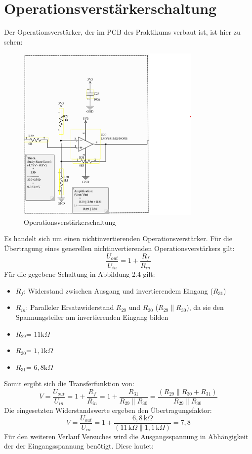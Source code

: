 \section{Operationsverstärkerschaltung} %
Der Operationsverstärker, der im PCB des Praktikums verbaut ist, ist hier zu sehen:
\begin{figure}[H]
    \centering
    \includegraphics[width=0.8\textwidth]{Pictures/OP_Verstaerker.png}
    \caption{Operationsverstärkerschaltung}
    \label{fig:opamp_schaltung}
\end{figure}
Es handelt sich um einen nichtinvertierenden Operationsverstärker.
Für die Übertragung eines generellen nichtinvertierenden Operationsverstärkers gilt:
\begin{equation}
    \frac{U_{out}}{U_{in}} = 1 + \frac{R_f}{R_{in}}
\end{equation}
Für die gegebene Schaltung in Abbildung 2.4 gilt:
\begin{itemize}
    \item $R_f$: Widerstand zwischen Ausgang und invertierendem Eingang ($R_{31}$)
    \item $R_{in}$: Paralleler Ersatzwiderstand $R_{29}$ und $R_{30}$ ($R_{29}\parallel R_{30}$), da sie den Spannungsteiler am invertierenden Eingang bilden
    \item $R_{29}$= $11 \mathrm{k}\Omega$
    \item $R_{30}$= $1,1 \mathrm{k}\Omega$
    \item $R_{31}$= $6,8 \mathrm{k}\Omega$
\end{itemize}
Somit ergibt sich die Transferfunktion von:
\begin{equation}
    V = \frac{U_{out}}{U_{in}} = 1 + \frac{R_f}{R_{in}} = 1 + \frac{R_{31}}{R_{29}\parallel R_{30}}=\frac{(R_{29} \parallel R_{30}+R_{31})}{R_{29}\parallel R_{30}}
\end{equation}
Die eingesetzten Widerstandswerte ergeben den Übertragungsfaktor:
\begin{equation}
    V = \frac{U_{out}}{U_{in}} = 1 + \frac{6,8\,\mathrm{k}\Omega}{(11\,\mathrm{k}\Omega \parallel 1,1\,\mathrm{k}\Omega)} = 7,8
\end{equation}
Für den weiteren Verlauf Versuches wird die Ausgangsspannung in Abhängigkeit der der Eingangsspannung
benötigt. Diese lautet:


